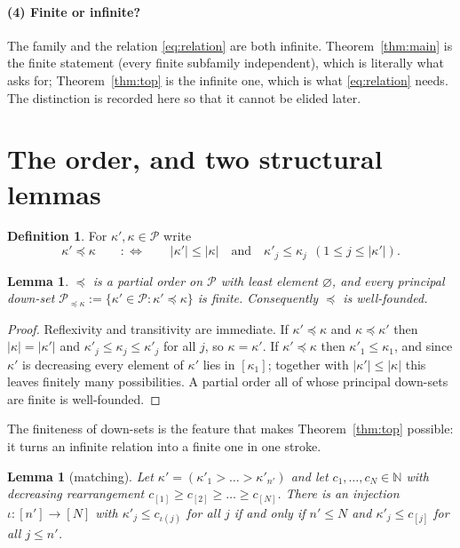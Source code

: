 \documentclass[11pt]{article}
\newtheorem{lem}[thm]{Lemma}
\theoremstyle{definition}
\newtheorem{defn}[thm]{Definition}
\theoremstyle{remark}
\newcommand{\NN}{\mathbb{N}}
\newcommand{\PP}{\mathcal{P}}
\begin{document}
\paragraph{(4) Finite or infinite?}
The family and the relation \eqref{eq:relation} are both infinite. Theorem~\ref{thm:main} is
the finite statement (every finite subfamily independent), which is literally what \cite{GDMW}
asks for; Theorem~\ref{thm:top} is the infinite one, which is what \eqref{eq:relation} needs.
The distinction is recorded here so that it cannot be elided later.

\section{The order, and two structural lemmas}

\begin{defn}\label{def:order}
For $\kappa',\kappa\in\PP$ write
\[
  \kappa'\preceq\kappa
  \qquad :\Longleftrightarrow\qquad
  |\kappa'|\le|\kappa| \quad\text{and}\quad \kappa'_j\le\kappa_j \ \ (1\le j\le|\kappa'|).
\]
\end{defn}

\begin{lem}\label{lem:order}
$\preceq$ is a partial order on $\PP$ with least element $\varnothing$, and every principal
down-set $\PP_{\preceq\kappa}:=\{\kappa'\in\PP:\kappa'\preceq\kappa\}$ is \emph{finite}.
Consequently $\preceq$ is well-founded.
\end{lem}

\begin{proof}
Reflexivity and transitivity are immediate. If $\kappa'\preceq\kappa$ and
$\kappa\preceq\kappa'$ then $|\kappa|=|\kappa'|$ and $\kappa'_j\le\kappa_j\le\kappa'_j$ for all
$j$, so $\kappa=\kappa'$. If $\kappa'\preceq\kappa$ then $\kappa'_1\le\kappa_1$, and since
$\kappa'$ is decreasing every element of $\kappa'$ lies in $[\kappa_1]$; together with
$|\kappa'|\le|\kappa|$ this leaves finitely many possibilities. A partial order all of whose
principal down-sets are finite is well-founded.
\end{proof}

The finiteness of down-sets is the feature that makes Theorem~\ref{thm:top} possible: it turns
an infinite relation into a finite one in one stroke.

\begin{lem}[matching]\label{lem:match}
Let $\kappa'=(\kappa'_1>\dots>\kappa'_{n'})$ and let $c_1,\dots,c_N\in\NN$ with decreasing
rearrangement $c_{[1]}\ge c_{[2]}\ge\dots\ge c_{[N]}$. There is an injection
$\iota:[n']\to[N]$ with $\kappa'_j\le c_{\iota(j)}$ for all $j$ if and only if $n'\le N$ and
$\kappa'_j\le c_{[j]}$ for all $j\le n'$.
\end{lem}
\end{document}
